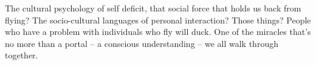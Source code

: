 

The cultural psychology of self deficit, that social force that holds
us back from flying?  The socio-cultural languages of personal
interaction?  Those things?  People who have a problem with
individuals who fly will duck.  One of the miracles that's no more
than a portal -- a conscious understanding -- we all walk through
together.

\bye
